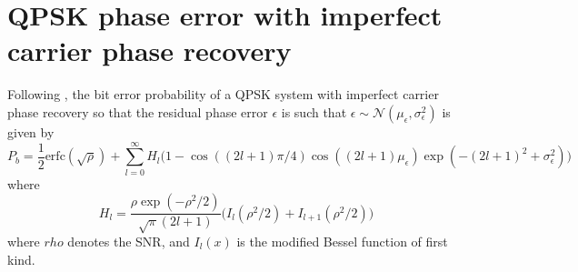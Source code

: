 \documentclass[a4paper]{article}
\begin{document}
\section{QPSK phase error with imperfect carrier phase recovery}
Following \cite{Prabhu1976}, the bit error probability of a QPSK system with imperfect carrier phase recovery so that the residual phase error $\epsilon$ is such that $\epsilon \sim \mathcal{N}(\mu_\epsilon, \sigma_\epsilon^2)$ is given by
\begin{equation}
P_b = \frac{1}{2}\mathrm{erfc}(\sqrt{\rho}) + \sum_{l = 0}^\infty H_l\Big(1 - \cos((2l+1)\pi/4)\cos((2l+1)\mu_\epsilon)\exp(-(2l+1)^2+\sigma_\epsilon^2)\Big)
\end{equation}
where
\begin{equation}
H_l = \frac{\rho\exp(-\rho^2/2)}{\sqrt{\pi}(2l+1)}\Big(I_l(\rho^2/2) + I_{l+1}(\rho^2/2)\Big)
\end{equation}
where $rho$ denotes the SNR, and $I_l(x)$ is the modified Bessel function of first kind.





\end{document}
